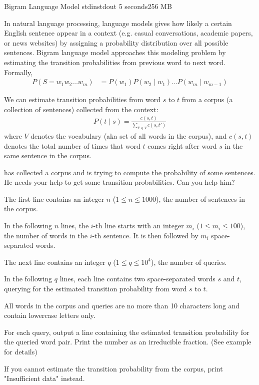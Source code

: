 
\begin{problem}{Bigram Language Model}
{stdin}{stdout}
{5 seconds}{256 MB}{}

In natural language processing, language models gives how likely a certain English sentence appear in a context (e.g. casual conversations, academic papers, or news websites) by assigning a probability distribution over all possible sentences. Bigram language model approaches this modeling problem by estimating the transition probabilities from previous word to next word. Formally,
\begin{align*}
	P(S = w_1 w_2 \hdots w_m) &= P(w_1)P(w_2 \mid w_1) \hdots P(w_m \mid w_{m-1})
\end{align*}

We can estimate transition probabilities from word $s$ to $t$ from a corpus (a collection of sentences) collected from the context:
\begin{align*}
	P(t \mid s) = \frac{c(s,t)}{\sum_{t' \in V}{c(s,t')}}
\end{align*}
where $V$ denotes the vocabulary (aka set of all words in the corpus), and $c(s,t)$ denotes the total number of times that word $t$ comes right after word $s$ in the same sentence in the corpus.

\Suzukaze has collected a corpus and is trying to compute the probability of some sentences. He needs your help to get some transition probabilities. Can you help him?

\InputFile

The first line contains an integer $n$ ($1 \le n \le 1000$), the number of sentences in the corpus.

In the following $n$ lines, the $i$-th line starts with an integer $m_i$ ($1 \le m_i \le 100$), the number of words in the $i$-th sentence. It is then followed by $m_i$ space-separated words.

The next line contains an integer $q$ ($1 \le q \le 10^4$), the number of queries.

In the following $q$ lines, each line contains two space-separated words $s$ and $t$, querying for the estimated transition probability from word $s$ to $t$.

All words in the corpus and queries are no more than 10 characters long and contain lowercase letters only.

\OutputFile

For each query, output a line containing the estimated transition probability for the queried word pair. Print the number as an irreducible fraction. (See example for details)

If you cannot estimate the transition probability from the corpus, print "Insufficient data" instead.

\Examples

\begin{example}
%
\end{example}

\end{problem}
